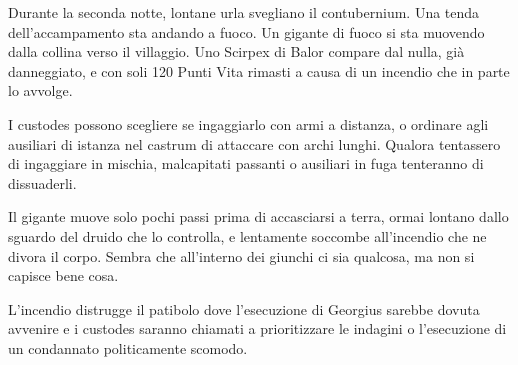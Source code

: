 \documentclass[11.5pt,twocolumn]{article}
\begin{document}
Durante la seconda notte, lontane urla svegliano il contubernium.
Una tenda dell'accampamento sta andando a fuoco.
Un gigante di fuoco si sta muovendo dalla collina verso il villaggio.
Uno Scirpex di Balor compare dal nulla, gi\`{a} danneggiato, e con soli 120 Punti Vita rimasti a causa di un incendio che in parte lo avvolge.


I custodes possono scegliere se ingaggiarlo con armi a distanza, o ordinare agli ausiliari di istanza nel castrum di attaccare con archi lunghi.
Qualora tentassero di ingaggiare in mischia, malcapitati passanti o ausiliari in fuga tenteranno di dissuaderli.

Il gigante muove solo pochi passi prima di accasciarsi a terra, ormai lontano dallo sguardo del druido che lo controlla, e lentamente soccombe all'incendio che ne divora il corpo.
Sembra che all'interno dei giunchi ci sia qualcosa, ma non si capisce bene cosa.

L'incendio distrugge il patibolo dove l'esecuzione di Georgius sarebbe dovuta avvenire e i custodes saranno chiamati a prioritizzare le indagini o l'esecuzione di un condannato politicamente scomodo.
\end{document}
